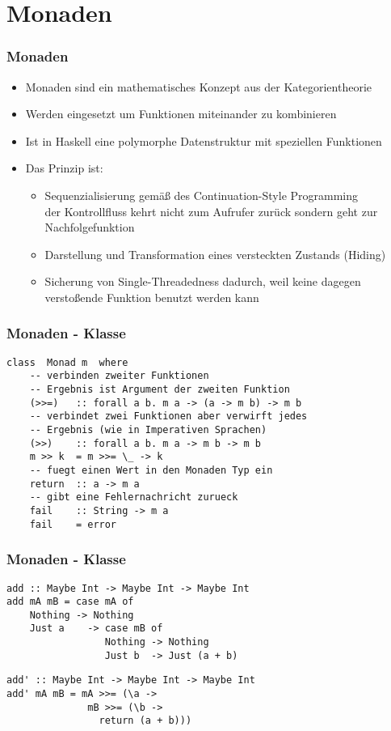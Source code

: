 \documentclass[fleqn,11pt,aspectratio=43]{beamer}
\begin{document}
\section{Monaden}
\begin{frame}
\frametitle{Monaden}
\begin{block}{\vspace*{-3ex}}
\begin{itemize}
\item Monaden sind ein mathematisches Konzept aus der Kategorientheorie
\item Werden eingesetzt um Funktionen miteinander zu kombinieren 
\item Ist in Haskell eine polymorphe Datenstruktur mit speziellen Funktionen
\item Das Prinzip ist:
\begin{itemize}
\item Sequenzialisierung gemäß des Continuation-Style Programming \\
	der Kontrollfluss kehrt nicht zum Aufrufer zurück sondern geht zur Nachfolgefunktion 
\item Darstellung und Transformation eines versteckten Zustands (Hiding)
\item Sicherung von Single-Threadedness dadurch, weil keine dagegen verstoßende Funktion benutzt werden kann
\end{itemize}
\end{itemize}
\end{block}
\end{frame}

\begin{frame}[fragile]
\frametitle{Monaden - Klasse}
\begin{lstlisting}
class  Monad m  where
    -- verbinden zweiter Funktionen
    -- Ergebnis ist Argument der zweiten Funktion
    (>>=)   :: forall a b. m a -> (a -> m b) -> m b
    -- verbindet zwei Funktionen aber verwirft jedes 
    -- Ergebnis (wie in Imperativen Sprachen)
    (>>)    :: forall a b. m a -> m b -> m b
    m >> k  = m >>= \_ -> k
    -- fuegt einen Wert in den Monaden Typ ein
    return  :: a -> m a
    -- gibt eine Fehlernachricht zurueck
    fail    :: String -> m a
    fail    = error
\end{lstlisting}	
\end{frame}

\begin{frame}[fragile]
\frametitle{Monaden - Klasse}
\begin{lstlisting}
add :: Maybe Int -> Maybe Int -> Maybe Int
add mA mB = case mA of
    Nothing -> Nothing
    Just a    -> case mB of
                 Nothing -> Nothing
                 Just b  -> Just (a + b)
\end{lstlisting}	
\pause
\begin{lstlisting}
add' :: Maybe Int -> Maybe Int -> Maybe Int
add' mA mB = mA >>= (\a ->
              mB >>= (\b ->
                return (a + b)))
\end{lstlisting}	
\end{frame}
\end{document}
